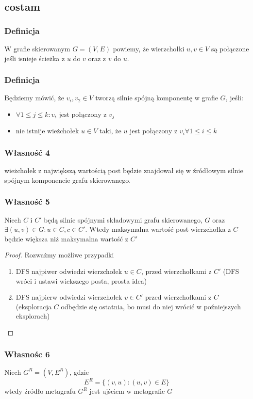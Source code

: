 \documentclass[11pt,a4paper]{article}
\begin{document}
\subsection{costam}
\subsubsection*{Definicja}
W grafie skierowanym $G=(V,E)$ powiemy, że wierzchołki $u,v \in V$ są połączone jeśli isnieje ścieżka z $u$ do $v$ oraz z $v$ do $u$.
\subsubsection*{Definicja}
Będziemy mówić, że $v_i, v_2 \in V$ tworzą silnie spójną komponentę w grafie $G$, jeśli:
\begin{itemize}
    \item $\forall 1 \leq j \leq k: v_i \text{ jest połączony z } v_j$
    \item nie istnije wieżchołek $u\in V$ taki, że $u$ jest połączony z $v_i \forall 1 \leq i \leq k$
\end{itemize}
\subsubsection{Własność 4}
wieżchołek z największą wartością post będzie znajdował się w źródłowym silnie spójnym komponencie grafu skierowanego.
\subsubsection{Własność 5}
Niech $C$ i $C'$ będą silnie spójnymi składowymi grafu skierowanego, $G$ oraz $\exists (u,v) \in G: u\in C, c \in C'$. Wtedy
maksymalna wartość post wierzchołka z $C$ będzie większa niż maksymalna wartość z $C'$
\begin{proof}
    Rozważmy możliwe przypadki
    \begin{enumerate}
        \item DFS najpiwer odwiedzi wierzchołek $u \in C$, przed wierzchołkami z $C'$ (DFS wróci i ustawi wiekszego posta, prosta idea)
        \item DFS najpierw odwiedzi wierzchołek $v \in C'$ przed wierzchołkami z $C$ (eksploracja $C$ odbędzie się ostatnia, bo musi do niej wrócić w poźniejszych eksplorach)
    \end{enumerate}
\end{proof}

\subsubsection{Własnośc 6}
Niech $G^R=(V,E^R)$, gdzie
\[
    E^R=\{(v,u): (u,v) \in E\}
\]
wtedy źródło metagrafu $G^R$ jest ujściem w metagrafie $G$
\end{document}
